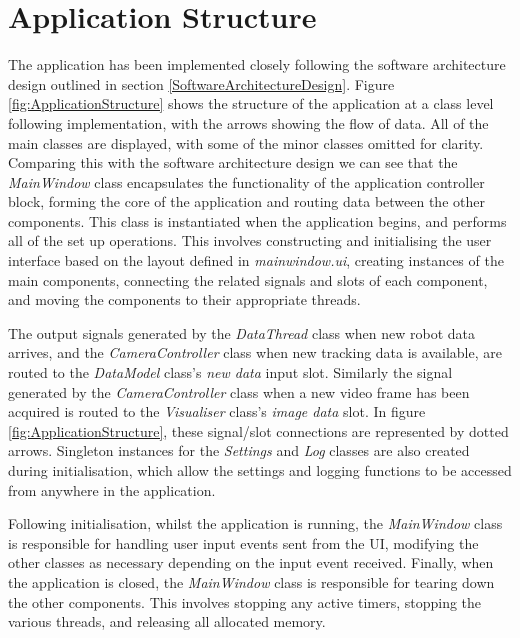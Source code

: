 
\section{Application Structure} \label{ApplicationStructure}
The application has been implemented closely following the software architecture design outlined in section \ref{SoftwareArchitectureDesign}. Figure \ref{fig:ApplicationStructure} shows the structure of the application at a class level following implementation, with the arrows showing the flow of data. All of the main classes are displayed, with some of the minor classes omitted for clarity. Comparing this with the software architecture design we can see that the \textit{MainWindow} class encapsulates the functionality of the application controller block, forming the core of the application and routing data between the other components. This class is instantiated when the application begins, and performs all of the set up operations. This involves constructing and initialising the user interface based on the layout defined in \textit{mainwindow.ui}, creating instances of the main components, connecting the related signals and slots of each component, and moving the components to their appropriate threads. 

The output signals generated by the \textit{DataThread} class when new robot data arrives, and the \textit{CameraController} class when new tracking data is available, are routed to the \textit{DataModel} class's \textit{new data} input slot. Similarly the signal generated by the \textit{CameraController} class when a new video frame has been acquired is routed to the \textit{Visualiser} class's \textit{image data} slot. In figure \ref{fig:ApplicationStructure}, these signal/slot connections are represented by dotted arrows. Singleton instances for the \textit{Settings} and \textit{Log} classes are also created during initialisation, which allow the settings and logging functions to be accessed from anywhere in the application. 

Following initialisation, whilst the application is running, the \textit{MainWindow} class is responsible for handling user input events sent from the UI, modifying the other classes as necessary depending on the input event received. Finally, when the application is closed, the \textit{MainWindow} class is responsible for tearing down the other components. This involves stopping any active timers, stopping the various threads, and releasing all allocated memory.

